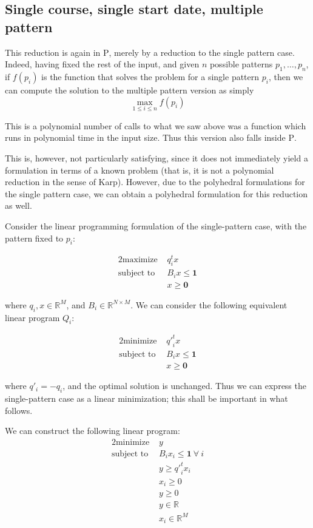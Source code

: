 \subsection{Single course, single start date, multiple pattern}

This reduction is again in \textsc{P}, merely by a reduction to the single pattern case. Indeed, having fixed the rest of the input, and given $n$ possible patterns $p_1, \dots, p_n$, if $f(p_i)$ is the function that solves the problem for a single pattern $p_i$, then we can compute the solution to the multiple pattern version as simply
$$
\max_{1 \le i \le n} f(p_i)
$$

This is a polynomial number of calls to what we saw above was a function which runs in polynomial time in the input size. Thus this version also falls inside \textsc{P}.

This is, however, not particularly satisfying, since it does not immediately yield a formulation in terms of a known problem (that is, it is not a polynomial reduction in the sense of Karp). However, due to the polyhedral formulations for the single pattern case, we can obtain a polyhedral formulation for this reduction as well.

Consider the linear programming formulation of the single-pattern case, with the pattern fixed to $p_i$:

\begin{alignat*}{2}
  \text{maximize } & q_i^t x \\
  \text{subject to } & B_i x \le \mathbf{1}\\
                     & x \ge \mathbf{0}
\end{alignat*}

where $q_i, x \in \mathbb{R}^M$, and $B_i \in \mathbb{R}^{N \times M}$. We can consider the following equivalent linear program $Q_i$:

\begin{alignat*}{2}
  \text{minimize } & {q'}_i^t x \\
  \text{subject to } & B_i x \le \mathbf{1}\\
                     & x \ge \mathbf{0}
\end{alignat*}

where $q'_i = -q_i$, and the optimal solution is unchanged. Thus we can express the single-pattern case as a linear minimization; this shall be important in what follows.

We can construct the following linear program:
\begin{alignat*}{2}
  \text{minimize } & y\\
  \text{subject to } & B_i x_i \le \mathbf{1}\ \forall\ i\\
                     & y \ge {q'}_i^t x_i\\
                     & x_i \ge 0\\
                     & y \ge 0\\
                     & y \in \mathbb{R}\\
                     & x_i \in \mathbb{R}^M\\
\end{alignat*}

